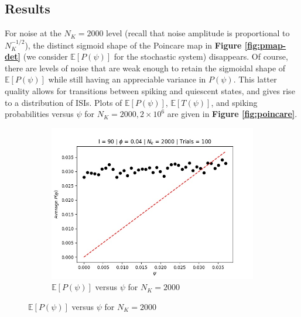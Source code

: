 \documentclass[letterpaper,12pt]{article}
\numberwithin{table}{section}
\numberwithin{figure}{section}
\numberwithin{equation}{section}
\newcommand*{\ev}[1]{\mathbb{E}\left[#1\right]}
\newcommand{\reffig}[1]{\textbf{Figure \ref{#1}}}
\begin{document}
\begin{flushleft}
    \subsection{Results}

    For noise at the $N_K = 2000$ level (recall that noise amplitude is proportional to $N_K^{-1/2}$), the distinct sigmoid shape of the Poincare map in \reffig{fig:pmap-det} (we consider $\ev{P(\psi)}$ for the stochastic system) disappears. Of course, there are levels of noise that are weak enough to retain the sigmoidal shape of $\ev{P(\psi)}$ while still having an appreciable variance in $P(\psi)$. This latter quality allows for transitions between spiking and quiescent states, and gives rise to a distribution of ISIs. Plots of $\ev{P(\psi)}$, $\ev{T(\psi)}$, and spiking probabilities versus $\psi$ for $N_K = 2000, 2 \times 10^6$ are given in \reffig{fig:poincare}.

    \begin{figure}[!h]

        \centering

        \begin{subfigure}{0.72\textwidth}
            \includegraphics[width=\linewidth]{img/pmap-nk2000.jpg}
            \caption{$\ev{P(\psi)}$ versus $\psi$ for $N_K = 2000$}
        \end{subfigure}
    

\end{figure}
\end{flushleft}
\end{document}
